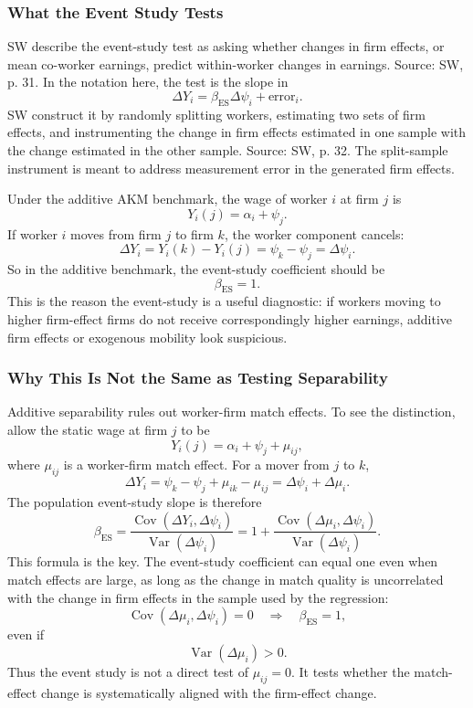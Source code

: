 ﻿\documentclass[11pt]{article}
\newcommand{\1}{\mathbf{1}}
\newcommand{\Var}{\operatorname{Var}}
\newcommand{\Cov}{\operatorname{Cov}}
\begin{document}
\subsubsection{What the Event Study Tests}

SW describe the event-study test as asking whether changes in firm effects, or
mean co-worker earnings, predict within-worker changes in earnings. Source: SW,
p. 31. In the notation here, the test is the slope in
\[
\Delta Y_i
=
\beta_{\mathrm{ES}}\Delta\psi_i+\text{error}_i.
\]
SW construct it by randomly splitting workers, estimating two sets of firm
effects, and instrumenting the change in firm effects estimated in one sample
with the change estimated in the other sample. Source: SW, p. 32. The split-sample
instrument is meant to address measurement error in the generated firm effects.

Under the additive AKM benchmark, the wage of worker $i$ at firm $j$ is
\[
Y_i(j)=\alpha_i+\psi_j.
\tag{AKM}
\]
If worker $i$ moves from firm $j$ to firm $k$, the worker component cancels:
\[
\Delta Y_i
=
Y_i(k)-Y_i(j)
=
\psi_k-\psi_j
=
\Delta\psi_i.
\]
So in the additive benchmark, the event-study coefficient should be
\[
\beta_{\mathrm{ES}}=1.
\]
This is the reason the event-study is a useful diagnostic: if workers moving to
higher firm-effect firms do not receive correspondingly higher earnings, additive
firm effects or exogenous mobility look suspicious.

\subsubsection{Why This Is Not the Same as Testing Separability}

Additive separability rules out worker-firm match effects. To see the distinction,
allow the static wage at firm $j$ to be
\[
Y_i(j)=\alpha_i+\psi_j+\mu_{ij},
\tag{Match}
\]
where $\mu_{ij}$ is a worker-firm match effect. For a mover from $j$ to $k$,
\[
\Delta Y_i
=
\psi_k-\psi_j+\mu_{ik}-\mu_{ij}
=
\Delta\psi_i+\Delta\mu_i.
\]
The population event-study slope is therefore
\[
\beta_{\mathrm{ES}}
=
\frac{\Cov(\Delta Y_i,\Delta\psi_i)}{\Var(\Delta\psi_i)}
=
1+
\frac{\Cov(\Delta\mu_i,\Delta\psi_i)}{\Var(\Delta\psi_i)}.
\tag{ES-slope}
\]
This formula is the key. The event-study coefficient can equal one even when
match effects are large, as long as the change in match quality is uncorrelated
with the change in firm effects in the sample used by the regression:
\[
\Cov(\Delta\mu_i,\Delta\psi_i)=0
\quad\Rightarrow\quad
\beta_{\mathrm{ES}}=1,
\]
even if
\[
\Var(\Delta\mu_i)>0.
\]
Thus the event study is not a direct test of $\mu_{ij}=0$. It tests whether the
match-effect change is systematically aligned with the firm-effect change.
\end{document}
